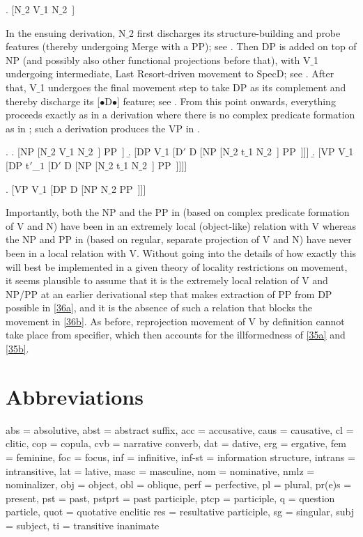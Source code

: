\documentclass[output=paper
,modfonts
,nonflat]{langsci/langscibook}
\begin{document}
\Lsciexi. [N$\_$2 V$\_$1 N$\_$2~]

In the ensuing derivation, N$\_$2 first discharges its structure-building
and probe features (thereby undergoing Merge with a PP); see \Next[a].
Then
DP is added on top of NP (and possibly also other functional projections
before that), with V$\_$1 undergoing intermediate, Last Resort-driven
movement to SpecD; see \Next[a]. After that, V$\_$1 undergoes the
final  movement step to take DP as its complement and thereby
discharge its [{\small $\bullet$}D{\small $\bullet$}] feature; see
\Next[b]. From this point onwards, everything proceeds exactly as in
a derivation where there is no complex predicate formation as in
\Next; such a derivation produces the VP in \NNext. 

\Lsciexi.
\a. [NP [N$\_$2 V$\_$1 N$\_$2~] PP~]
\b. [DP V$\_$1 [D$'$ D [NP [N$\_$2 t$\_$1 N$\_$2~] PP~]]]
\b. [VP V$\_$1 [DP t$'$\_$1$ [D$'$ D [NP [N$\_$2 t$\_$1 N$\_$2~] PP~]]]]

\Lsciexi. [VP V$\_$1 [DP D [NP N$\_$2 PP~]]]

Importantly, both the NP and the PP in \LLast[c] (based on complex
predicate formation of V and N) have been in an extremely local
(object-like) relation with V whereas the NP and PP in \Last (based
on regular, separate projection of V and N) have never been in a local
relation with V. Without going into the details of how exactly this
will best be implemented in a given theory of locality restrictions on movement, it
seems plausible to assume that it is the extremely local relation of V
and NP/PP at an earlier derivational step that makes extraction of PP
from DP possible in  \ref{36a}, and it is the absence of such a relation that blocks
the movement in \ref{36b}. As before, reprojection movement of V
by definition cannot take place from specifier, which then accounts
for the illformedness of \ref{35a} and \ref{35b}.

\section*{Abbreviations}

abs = absolutive, 
abst = abstract suffix, 
acc = accusative,
caus = causative, 
cl = clitic, 
cop = copula, 
cvb = narrative converb, 
dat = dative, 
erg = ergative, 
fem = feminine, 
foc = focus, 
inf = infinitive, 
inf-st = information structure, 
intrans = intransitive, 
lat = lative, 
masc = masculine, 
nom = nominative, 
nmlz = nominalizer, 
obj = object, 
obl = oblique,
perf = perfective,
pl = plural, 
pr(e)s = present, 
pst = past, 
pstprt = past participle,
ptcp = participle, 
q = question particle, 
quot = quotative enclitic
res = resultative participle, 
sg = singular, 
subj = subject, 
ti = transitive inanimate 
\end{document}
